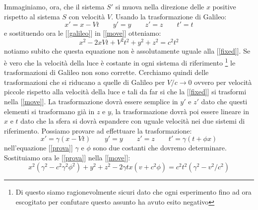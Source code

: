 \documentclass[a4paper,10pt,twoside]{article}
\begin{document}
Immaginiamo, ora, che il sistema $S'$ si muova nella direzione delle $x$ positive rispetto al sistema $S$ con velocità $V$. Usando la trasformazione di Galileo:
\begin{equation}\label{galileo}
x'=x-Vt\qquad y'=y\qquad z'=z\qquad t'=t
\end{equation}
e sostituendo ora le [\ref{galileo}] in [\ref{move}] otteniamo:
\begin{equation}
x^2-2xVt+V^2t^2+y^2+z^2=c^2t^2
\end{equation}
notiamo subito che questa equazione non è assolutamente uguale alla [\ref{fixed}]. Se è vero che la velocità della luce è costante in ogni sistema di riferimento \footnote{Di questo siamo ragionevolmente sicuri dato che ogni esperimento fino ad ora escogitato per confutare questo assunto ha avuto esito negativo} le trasformazioni di Galileo non sono corrette. Cerchiamo quindi delle trasformazioni che si riducano a quelle di Galileo per $V/c\to 0$ ovvero per velocità piccole rispetto alla velocità della luce e tali da far si che la [\ref{fixed}] si trasformi nella [\ref{move}].
La trasformazione dovrà essere semplice in $y'$ e $z'$ dato che questi elementi si trasformano già in $z$ e $y$, la trasformazione dovrà poi essere lineare in $x$ e $t$ dato che la sfera si dovrà espandere con uguale velocità nei due sistemi di riferimento. Possiamo provare ad effettuare la trasformazione:
\begin{equation}\label{prova}
x'=\gamma(x-Vt)\qquad y'=y\qquad z'=z\qquad t'=\gamma(t+\phi x)
\end{equation}
nell'equazione [\ref{prova}] $\gamma$ e $\phi$ sono due costanti che dovremo determinare. Sostituiamo ora le [\ref{prova}] nella [\ref{move}]:
\begin{equation}\label{sost}
 x^2(\gamma^2-c^2\gamma^2\phi^2)+y^2+z^2-2\gamma tx(v+c^2\phi)=c^2t^2(\gamma^2-v^2/c^2)
\end{equation}
\end{document}
